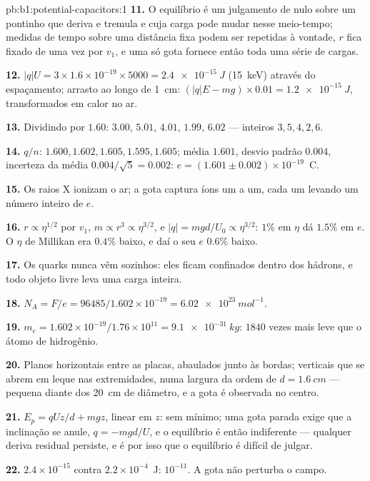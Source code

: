\begin{solution}{pb:b1:potential-capacitors:1}
\textbf{11.} O equilíbrio é um julgamento de nulo sobre um pontinho que deriva e
tremula e cuja carga pode mudar nesse meio-tempo; medidas de tempo sobre uma distância fixa podem ser
repetidas à vontade, $r$ fica fixado de uma vez por $v_1$, e uma só gota
fornece então toda uma série de cargas.

\textbf{12.} $|q|U = 3 \times 1.6 \times 10^{-19} \times 5000 = \qty{2.4e-15}{J}$
(\qty{15}{keV}) através do espaçamento; arrasto ao longo de \qty{1}{cm}: $(|q|E - mg) \times 0.01 =
\qty{1.2e-15}{J}$, transformados em calor no ar.

\textbf{13.} Dividindo por $1.60$: $3.00$, $5.01$, $4.01$, $1.99$, $6.02$ ---
inteiros $3, 5, 4, 2, 6$.

\textbf{14.} $q/n$: $1.600, 1.602, 1.605, 1.595, 1.605$; média $1.601$,
desvio padrão $0.004$, incerteza da média $0.004/\sqrt5 =
0.002$: $e = (1.601 \pm 0.002) \times 10^{-19}$~C.

\textbf{15.} Os raios X ionizam o ar; a gota captura íons um a
um, cada um levando um número inteiro de $e$.

\textbf{16.} $r \propto \eta^{1/2}$ por $v_1$, $m \propto r^3 \propto \eta^{3/2}$, e
$|q| = mgd/U_0 \propto \eta^{3/2}$: $1\%$ em $\eta$ dá $1.5\%$ em $e$. O $\eta$ de Millikan
era $0.4\%$ baixo, e daí o seu $e$ $0.6\%$ baixo.

\textbf{17.} Os quarks nunca vêm sozinhos: eles ficam confinados dentro dos hádrons,
e todo objeto livre leva uma carga inteira.

\textbf{18.} $N_A = F/e = 96485/1.602 \times 10^{-19} = \qty{6.02e23}{mol^{-1}}$.

\textbf{19.} $m_e = 1.602 \times 10^{-19}/1.76 \times 10^{11} = \qty{9.1e-31}{kg}$: $1840$
vezes mais leve que o átomo de hidrogênio.

\textbf{20.} Planos horizontais entre as placas, abaulados junto às
bordas;  verticais que se abrem em leque nas extremidades, numa largura da
ordem de $d = \qty{1.6}{cm}$ --- pequena diante dos \qty{20}{cm} de diâmetro, e
a gota é observada no centro.

\textbf{21.} $E_p = qUz/d + mgz$, linear em $z$: sem mínimo; uma gota
parada exige que a inclinação se anule, $q = -mgd/U$, e o equilíbrio é
então indiferente --- qualquer deriva residual persiste, e é por isso que o
equilíbrio é difícil de julgar.

\textbf{22.} $2.4 \times 10^{-15}$ contra $2.2 \times 10^{-4}$~J: $10^{-11}$. A gota
não perturba o campo.


\end{solution}
